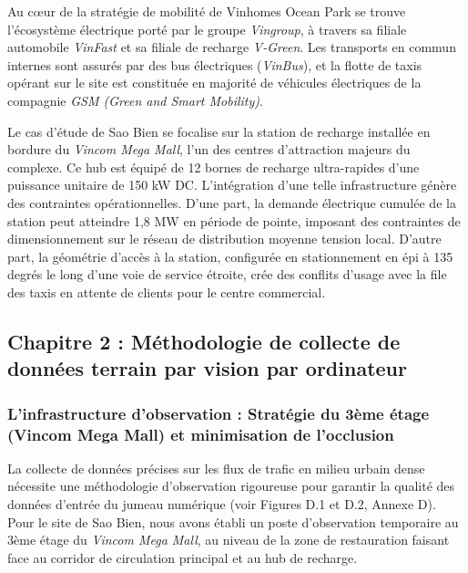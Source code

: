 \documentclass[10pt, a4paper]{article}
\begin{document}
Au cœur de la stratégie de mobilité de Vinhomes Ocean Park se trouve
l'écosystème électrique porté par le groupe \emph{Vingroup}, à travers
sa filiale automobile \emph{VinFast} et sa filiale de recharge
\emph{V-Green}. Les transports en commun internes sont assurés par des
bus électriques (\emph{VinBus}), et la flotte de taxis opérant sur le
site est constituée en majorité de véhicules électriques de la compagnie
\emph{GSM (Green and Smart Mobility)}.

Le cas d'étude de Sao Bien se focalise sur la station de recharge
installée en bordure du \emph{Vincom Mega Mall}, l'un des centres
d'attraction majeurs du complexe. Ce hub est équipé de 12 bornes de
recharge ultra-rapides d'une puissance unitaire de 150 kW DC.
L'intégration d'une telle infrastructure génère des contraintes
opérationnelles. D'une part, la demande électrique cumulée de la station
peut atteindre 1,8 MW en période de pointe, imposant des contraintes de
dimensionnement sur le réseau de distribution moyenne tension local.
D'autre part, la géométrie d'accès à la station, configurée en
stationnement en épi à 135 degrés le long d'une voie de service étroite,
crée des conflits d'usage avec la file des taxis en attente de clients
pour le centre commercial.

\newpage

\subsection{Chapitre 2 : Méthodologie de collecte de données terrain par
vision par
ordinateur}\label{chapitre-2-muxe9thodologie-de-collecte-de-donnuxe9es-terrain-par-vision-par-ordinateur}

\subsubsection{L'infrastructure d'observation : Stratégie du 3ème étage
(Vincom Mega Mall) et minimisation de
l'occlusion}\label{linfrastructure-dobservation-stratuxe9gie-du-3uxe8me-uxe9tage-vincom-mega-mall-et-minimisation-de-locclusion}

La collecte de données précises sur les flux de trafic en milieu urbain
dense nécessite une méthodologie d'observation rigoureuse pour garantir
la qualité des données d'entrée du jumeau numérique (voir Figures D.1 et
D.2, Annexe D). Pour le site de Sao Bien, nous avons établi un poste
d'observation temporaire au 3ème étage du \emph{Vincom Mega Mall}, au
niveau de la zone de restauration faisant face au corridor de
circulation principal et au hub de recharge.
\end{document}
